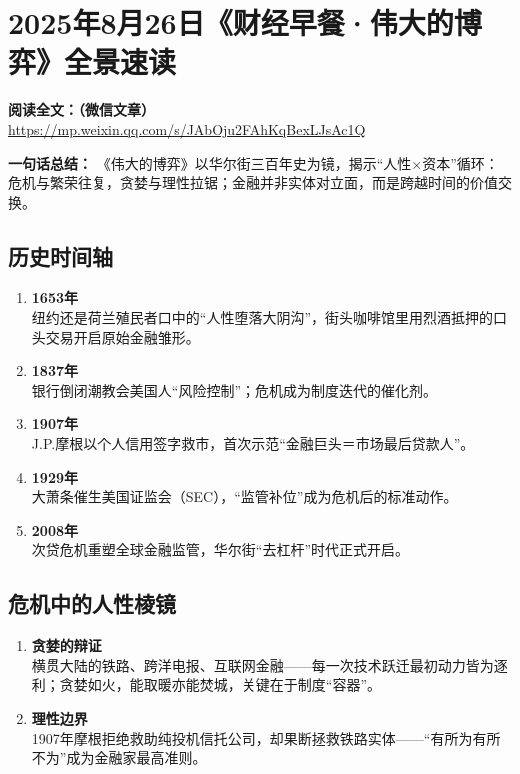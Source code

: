 \section{2025年8月26日《财经早餐·伟大的博弈》全景速读}
\vspace{1cm}
\noindent\textbf{阅读全文：（微信文章）} \url{
https://mp.weixin.qq.com/s/JAbOju2FAhKqBexLJsAc1Q}

\textbf{一句话总结：}  
《伟大的博弈》以华尔街三百年史为镜，揭示“人性×资本”循环：危机与繁荣往复，贪婪与理性拉锯；金融并非实体对立面，而是跨越时间的价值交换。

\subsection{历史时间轴}
\begin{enumerate}[leftmargin=*, nosep]
  \item \textbf{1653年}  \\
  纽约还是荷兰殖民者口中的“人性堕落大阴沟”，街头咖啡馆里用烈酒抵押的口头交易开启原始金融雏形。
  
  \item \textbf{1837年}  \\
  银行倒闭潮教会美国人“风险控制”；危机成为制度迭代的催化剂。
  
  \item \textbf{1907年}  \\
  J.P.摩根以个人信用签字救市，首次示范“金融巨头＝市场最后贷款人”。
  
  \item \textbf{1929年}  \\
  大萧条催生美国证监会（SEC），“监管补位”成为危机后的标准动作。
  
  \item \textbf{2008年}  \\
  次贷危机重塑全球金融监管，华尔街“去杠杆”时代正式开启。
\end{enumerate}

\subsection{危机中的人性棱镜}
\begin{enumerate}[leftmargin=*, nosep]
  \item \textbf{贪婪的辩证}  \\
  横贯大陆的铁路、跨洋电报、互联网金融——每一次技术跃迁最初动力皆为逐利；贪婪如火，能取暖亦能焚城，关键在于制度“容器”。
  
  \item \textbf{理性边界}  \\
  1907年摩根拒绝救助纯投机信托公司，却果断拯救铁路实体——“有所为有所不为”成为金融家最高准则。
\end{enumerate}

